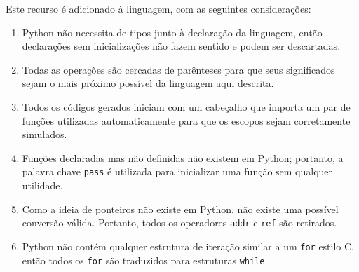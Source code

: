 \documentclass{article}
\newenvironment{smallenum}{
    \vspace{-1mm}
    \begin{enumerate}[label=\roman*.]
    \setlength{\parskip}{0pt}
    \setlength{\itemsep}{2pt}
}{
    \vspace{-2mm}
    \end{enumerate}
}
\begin{document}
Este recurso é adicionado à linguagem, com as seguintes considerações:

\begin{smallenum}

\item Python não necessita de tipos junto à declaração da linguagem, então
    declarações sem inicializações não fazem sentido e podem ser descartadas.

\item Todas as operações são cercadas de parênteses para que seus significados
    sejam o mais próximo possível da linguagem aqui descrita.

\item Todos os códigos gerados iniciam com um cabeçalho que importa um par
    de funções utilizadas automaticamente para que os escopos sejam
    corretamente simulados.

\item Funções declaradas mas não definidas não existem em Python; portanto,
    a palavra chave \texttt{pass} é utilizada para inicializar uma função
    sem qualquer utilidade.

\item Como a ideia de ponteiros não existe em Python, não existe uma possível
	conversão válida. Portanto, todos os operadores \texttt{addr} e
	\texttt{ref} são retirados.

\item Python não contém qualquer estrutura de iteração similar a um
    \texttt{for} estilo C, então todos os \texttt{for} são traduzidos para
    estruturas \texttt{while}.

\end{smallenum}
\end{document}
